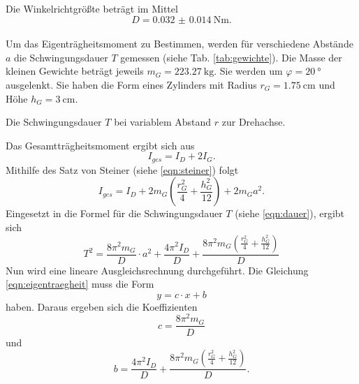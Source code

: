 Die Winkelrichtgrößte beträgt im Mittel
\begin{equation*}
    D = \SI{0.032(14)}{\newton\metre} .
\end{equation*}
\\
Um das Eigenträgheitsmoment zu Bestimmen, werden für verschiedene Abstände $a$ die Schwingungsdauer $T$ gemessen (siehe Tab. \ref{tab:gewichte}).
Die Masse der kleinen Gewichte beträgt jeweils $m_G = \SI{223,27}{\kg}$.
Sie werden um $\varphi = \SI{20}{\degree}$ ausgelenkt.
Sie haben die Form eines Zylinders mit Radius $r_G=\SI{1,75}{\centi\metre}$ und Höhe $h_G=\SI{3}{\centi\metre}$.
\begin{table}
    \centering
    \caption{Die Schwingungsdauer $T$ bei variablem Abstand $r$ zur Drehachse.}
    \label{tab:gewichte}  
\end{table}
\FloatBarrier
Das Gesamtträgheitsmoment ergibt sich aus
\begin{equation*}
    I_{ges} = I_D + 2 I_G .
\end{equation*}
Mithilfe des Satz von Steiner (siehe \autoref{eqn:steiner}) folgt
\begin{equation*}
    I_{ges} = I_D + 2 m_G \left ( \frac{r^2_G}{4} + \frac{h^2_G}{12} \right) + 2 m_G a^2 .
\end{equation*}
Eingesetzt in die Formel für die Schwingungsdauer $T$ (siehe \autoref{eqn:dauer}), ergibt sich
\begin{equation}
    T^2 = \frac{8 \pi^2 m_G}{D} \cdot a^2 + \frac{4 \pi^2 I_D}{D} + \frac{8 \pi^2 m_G \left (\frac{r^2_G}{4} + \frac{h^2_G}{12} \right )}{D}
    \label{eqn:eigentraegheit}
\end{equation}
Nun wird eine lineare Ausgleichsrechnung durchgeführt.
Die Gleichung \ref{eqn:eigentraegheit} muss die Form
\begin{equation*}
    y = c \cdot x + b 
\end{equation*}
haben.
Daraus ergeben sich die Koeffizienten
\begin{equation*}
    c = \frac{8\pi^2m_G}{D}
\end{equation*}
und
\begin{equation}
    b = \frac{4 \pi^2 I_D}{D} + \frac{8 \pi^2 m_G \left (\frac{r^2_G}{4} + \frac{h^2_G}{12} \right )}{D}.
    \label{eqn:b}
\end{equation}
